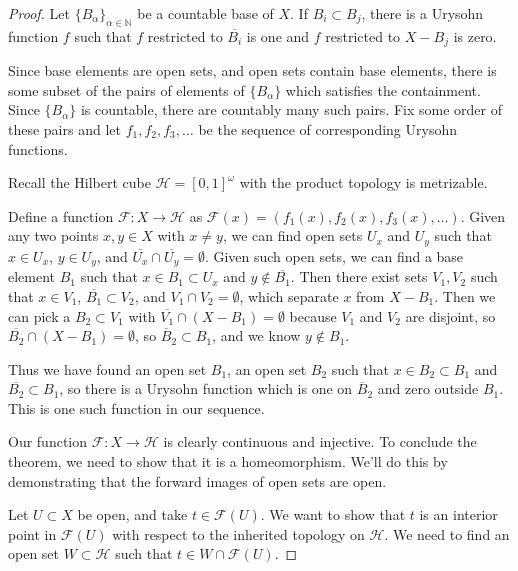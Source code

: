 \begin{proof}
	
	
	Let $\{B_\alpha\}_{\alpha\in \mathbb{N}}$ be a countable base of $X$.  If $B_i\subset B_j$, there is a Urysohn function $f$ such that $f$ restricted to $\overline{B_i}$ is one and $f$ restricted to $X{-}B_j$ is zero.
	
	Since base elements are open sets, and open sets contain base elements, there is some subset of the pairs of elements of $\{B_\alpha\}$ which satisfies the containment.  Since $\{B_\alpha\}$ is countable, there are countably many such pairs.  Fix some order of these pairs and let $f_1,f_2,f_3,\dots$ be the sequence of corresponding Urysohn functions.
	
	Recall the Hilbert cube $\mathcal{H} = [0,1]^\omega$ with the product topology is metrizable.
	
	Define a function $\mathcal{F}: X\rightarrow \mathcal{H}$ as $\mathcal{F}(x) = (f_1(x),f_2(x),f_3(x),\dots)$.  Given any two points $x,y\in X$ with $x\neq y$, we can find open sets $U_x$ and $U_y$ such that $x\in U_x$, $y\in U_y$, and $\overline{U_x}\cap \overline{U_y} = \emptyset$.  Given such open sets, we can find a base element $B_1$ such that $x\in B_1\subset U_x$ and $y\notin \overline{B_1}$.  Then there exist sets $V_1,V_2$ such that $x\in V_1$, $\overline{B_1}\subset V_2$, and $V_1\cap V_2 = \emptyset$, which separate $x$ from $X{-}B_1$.  Then we can pick a $B_2\subset V_1$ with $\overline{V_1}\cap (X{-}B_1) = \emptyset$ because $V_1$ and $V_2$ are disjoint, so $\overline{B_2}\cap(X{-}B_1) = \emptyset$, so $\overline{B}_2 \subset B_1$, and we know $y\notin B_1$.
	
	Thus we have found an open set $B_1$, an open set $B_2$ such that $x\in B_2\subset B_1$ and $\overline{B_2}\subset B_1$, so there is a Urysohn function which is one on $\overline{B}_2$ and zero outside $B_1$.  This is one such function in our sequence.
	
	Our function $\mathcal{F}:X\rightarrow\mathcal{H}$ is clearly continuous and injective.  To conclude the theorem, we need to show that it is a homeomorphism.  We'll do this by demonstrating that the forward images of open sets are open.
	
	Let $U\subset X$ be open, and take $t\in \mathcal{F}(U)$.  We want to show that $t$ is an interior point in $\mathcal{F}(U)$ with respect to the inherited topology on $\mathcal{H}$.  We need to find an open set $W\subset \mathcal{H}$ such that $t\in W\cap \mathcal{F}(U)$.
	

\end{proof}
